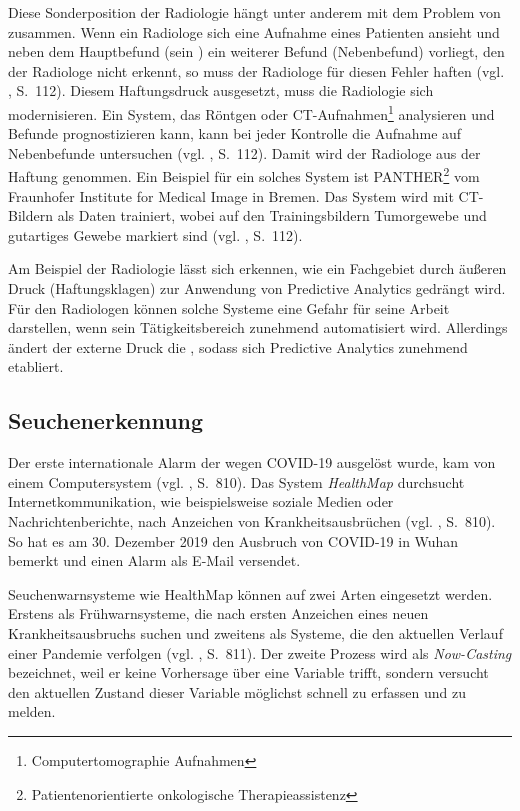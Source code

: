 Diese Sonderposition der Radiologie hängt unter anderem mit dem Problem von \grqq{} zusammen.
Wenn ein Radiologe sich eine Aufnahme eines Patienten ansieht und neben dem Hauptbefund (sein \grqq{})
ein weiterer Befund (Nebenbefund) vorliegt, den der Radiologe nicht erkennt, so muss der Radiologe für diesen Fehler haften
(vgl. \cite{Jorzig}, S.~112). Diesem Haftungsdruck ausgesetzt, muss die Radiologie sich modernisieren. Ein System,
das Röntgen oder CT-Aufnahmen\footnote{Computertomographie Aufnahmen} analysieren und Befunde prognostizieren kann, kann
bei jeder Kontrolle die Aufnahme auf Nebenbefunde untersuchen (vgl. \cite{Jorzig}, S.~112).
Damit wird der Radiologe aus der Haftung genommen. Ein Beispiel für ein solches System ist
PANTHER\footnote{Patientenorientierte onkologische Therapieassistenz} vom Fraunhofer Institute for Medical Image in Bremen.
Das System wird mit CT-Bildern als Daten trainiert, wobei auf den Trainingsbildern Tumorgewebe und gutartiges Gewebe markiert sind
(vgl. \cite{Jorzig}, S.~112).

Am Beispiel der Radiologie lässt sich erkennen, wie ein Fachgebiet durch äußeren Druck (Haftungsklagen) zur Anwendung von Predictive
Analytics gedrängt wird. Für den Radiologen können solche Systeme eine Gefahr für seine Arbeit darstellen, wenn sein Tätigkeitsbereich
zunehmend automatisiert wird. Allerdings ändert der externe Druck die \grqq{}, sodass
sich Predictive Analytics zunehmend etabliert.

\subsection{Seuchenerkennung}

Der erste internationale Alarm der wegen COVID-19 ausgelöst wurde, kam von einem Computersystem (vgl. \cite{Cho}, S.~810).
Das System \emph{HealthMap} durchsucht Internetkommunikation, wie beispielsweise soziale Medien oder Nachrichtenberichte,
nach Anzeichen von Krankheitsausbrüchen (vgl. \cite{Cho}, S.~810). So hat es am 30. Dezember 2019 den Ausbruch von
COVID-19 in Wuhan bemerkt und einen Alarm als E-Mail versendet.

Seuchenwarnsysteme wie HealthMap können auf zwei Arten eingesetzt werden. Erstens als Frühwarnsysteme, die nach ersten
Anzeichen eines neuen Krankheitsausbruchs suchen und zweitens als Systeme, die den aktuellen Verlauf einer Pandemie
verfolgen (vgl. \cite{Cho}, S.~811). Der zweite Prozess wird als \emph{Now-Casting} bezeichnet, weil er keine Vorhersage
über eine Variable trifft, sondern versucht den aktuellen Zustand dieser Variable möglichst schnell zu erfassen und zu melden.

